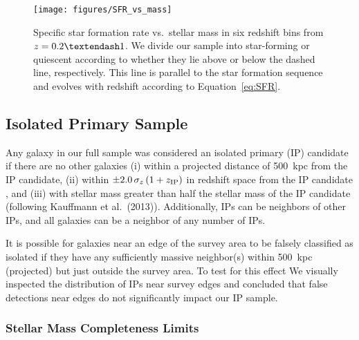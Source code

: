 \begin{figure}
  \centering
  \texttt{[image: figures/SFR\_vs\_mass]}
  \caption{ Specific star formation rate vs.~stellar mass in six redshift bins from ${z=0.2\textendash1}$.
We divide our sample into star-forming or quiescent according to whether they lie above or below the dashed line, respectively.
This line is parallel to the star formation sequence and evolves with redshift according to Equation~\ref{eq:SFR}.
}
  \label{fig:SFR_vs_mass}
\end{figure}

\subsection{Isolated Primary Sample}\label{sec:IPsample}

Any galaxy in our full sample was considered an isolated primary (IP) candidate if there are no other galaxies 
(i) within a projected distance of 500~kpc from the IP candidate,
(ii) within ${\pm 2.0\,\sigma_{z}\,(1 + z_{\rm IP})}$ in redshift space from the IP candidate , and
(iii) with stellar mass greater than half the stellar mass of the IP candidate (following Kauffmann et al.~(2013)).
Additionally, IPs can be neighbors of other IPs, and all galaxies can be a neighbor of any number of IPs.

It is possible for galaxies near an edge of the survey area to be falsely classified as isolated if they have any sufficiently massive neighbor(s) within 500~kpc (projected) but just outside the survey area.
To test for this effect We visually inspected the distribution of IPs near survey edges and concluded that false detections near edges do not significantly impact our IP sample.

\subsubsection{Stellar Mass Completeness Limits}\label{sec:mass_compare}

